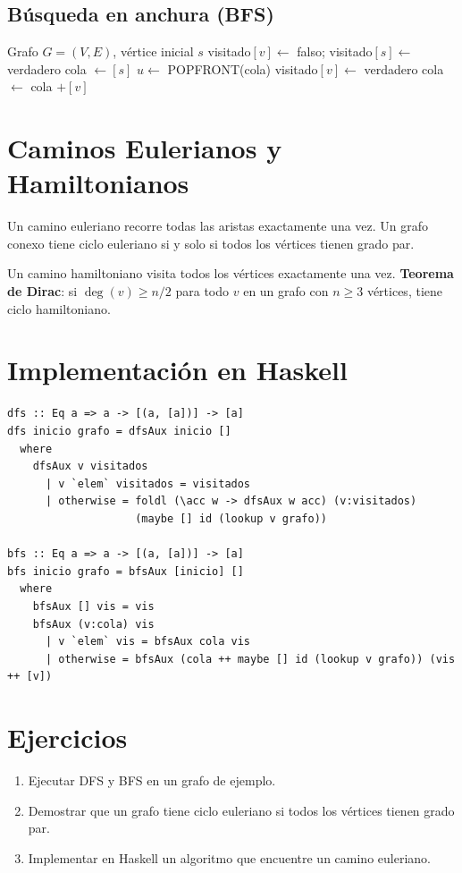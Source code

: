 \subsection{Búsqueda en anchura (BFS)}

\begin{algorithm}[htbp]
\caption{BFS}
\begin{algorithmic}[1]
\Require Grafo $G=(V,E)$, vértice inicial $s$
\State visitado$[v] \gets$ falso; visitado$[s] \gets$ verdadero
\State cola $\gets [s]$
  \State $u \gets$ POPFRONT(cola)
      \State visitado$[v] \gets$ verdadero
      \State cola $\gets$ cola $+ [v]$
    \EndIf
  \EndFor
\EndWhile
\end{algorithmic}
\end{algorithm}

\section{Caminos Eulerianos y Hamiltonianos}
Un camino euleriano recorre todas las aristas exactamente una vez. Un grafo conexo tiene ciclo euleriano si y solo si todos los vértices tienen grado par.

Un camino hamiltoniano visita todos los vértices exactamente una vez. \textbf{Teorema de Dirac}: si $\deg(v) \geq n/2$ para todo $v$ en un grafo con $n \geq 3$ vértices, tiene ciclo hamiltoniano.

\section{Implementación en Haskell}

\begin{lstlisting}[caption={DFS y BFS en Haskell}]
dfs :: Eq a => a -> [(a, [a])] -> [a]
dfs inicio grafo = dfsAux inicio []
  where
    dfsAux v visitados
      | v `elem` visitados = visitados
      | otherwise = foldl (\acc w -> dfsAux w acc) (v:visitados)
                    (maybe [] id (lookup v grafo))

bfs :: Eq a => a -> [(a, [a])] -> [a]
bfs inicio grafo = bfsAux [inicio] []
  where
    bfsAux [] vis = vis
    bfsAux (v:cola) vis
      | v `elem` vis = bfsAux cola vis
      | otherwise = bfsAux (cola ++ maybe [] id (lookup v grafo)) (vis ++ [v])
\end{lstlisting}

\section{Ejercicios}
\begin{enumerate}
  \item Ejecutar DFS y BFS en un grafo de ejemplo.
  \item Demostrar que un grafo tiene ciclo euleriano si todos los vértices tienen grado par.
  \item Implementar en Haskell un algoritmo que encuentre un camino euleriano.
\end{enumerate}